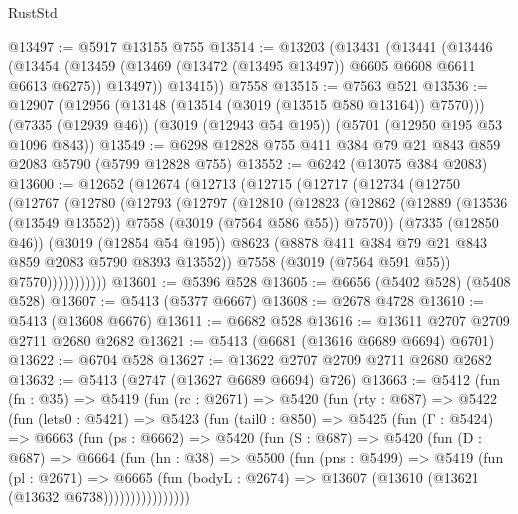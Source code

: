 \begin{lexlean}{RustStd}
\begin{coremodule}
@13497 := @5917 @13155 @755
@13514 := @13203
    (@13431
      (@13441
        (@13446
          (@13454 (@13459 (@13469 (@13472 (@13495 @13497)) @6605 @6608 @6611 @6613 @6275)) @13497))
        @13415))
    @7558
@13515 := @7563 @521
@13536 := @12907
    (@12956 (@13148 (@13514 (@3019 (@13515 @580 @13164)) @7570)))
    (@7335 (@12939 @46))
    (@3019 (@12943 @54 @195))
    (@5701 (@12950 @195 @53 @1096 @843))
@13549 := @6298 @12828 @755 @411 @384 @79 @21 @843 @859 @2083 @5790 (@5799 @12828 @755)
@13552 := @6242 (@13075 @384 @2083)
@13600 := @12652
    (@12674
      (@12713
        (@12715
          (@12717
            (@12734
              (@12750
                (@12767
                  (@12780
                    (@12793
                      (@12797
                        (@12810
                          (@12823
                            (@12862
                              (@12889
                                (@13536 (@13549 @13552))
                                @7558
                                (@3019 (@7564 @586 @55))
                                @7570))
                            (@7335 (@12850 @46))
                            (@3019 (@12854 @54 @195))
                            @8623
                            (@8878 @411 @384 @79 @21 @843 @859 @2083 @5790 @8393 @13552))
                          @7558
                          (@3019 (@7564 @591 @55))
                          @7570)))))))))))
@13601 := @5396 @528
@13605 := @6656 (@5402 @528) (@5408 @528)
@13607 := @5413 (@5377 @6667)
@13608 := @2678 @4728
@13610 := @5413 (@13608 @6676)
@13611 := @6682 @528
@13616 := @13611 @2707 @2709 @2711 @2680 @2682
@13621 := @5413 (@6681 (@13616 @6689 @6694) @6701)
@13622 := @6704 @528
@13627 := @13622 @2707 @2709 @2711 @2680 @2682
@13632 := @5413 (@2747 (@13627 @6689 @6694) @726)
@13663 := @5412
    (fun (fn : @35) =>
    @5419
      (fun (rc : @2671) =>
      @5420
        (fun (rty : @687) =>
        @5422
          (fun (lets0 : @5421) =>
          @5423
            (fun (tail0 : @850) =>
            @5425
              (fun (Γ : @5424) =>
              @6663
                (fun (ps : @6662) =>
                @5420
                  (fun (S : @687) =>
                  @5420
                    (fun (D : @687) =>
                    @6664
                      (fun (hn : @38) =>
                      @5500
                        (fun (pns : @5499) =>
                        @5419
                          (fun (pl : @2671) =>
                          @6665
                            (fun (bodyL : @2674) =>
                            @13607 (@13610 (@13621 (@13632 @6738))))))))))))))))

\end{coremodule}
\end{lexlean}
